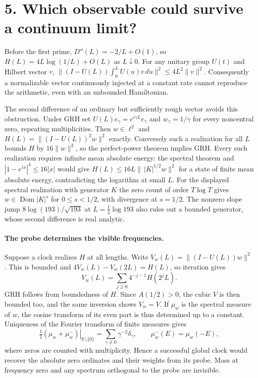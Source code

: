\documentclass[11pt]{article}
\begin{document}
\newpage
\section*{5. Which observable could survive a continuum limit?}
Before the first prime, $D''(L)=-2/L+O(1)$, so
$H(L)=4L\log(1/L)+O(L)$ as $L\downarrow0$.
For any unitary group $U(t)$ and Hilbert vector $v$,
$\|(I-U(L))\int_0^L U(u)v\,du\|^2\le4L^2\|v\|^2$.
Consequently a normalizable vector continuously injected at a constant
rate cannot reproduce the arithmetic, even with an unbounded Hamiltonian.

The second difference of an ordinary but sufficiently rough vector avoids
this obstruction. Under GRH set $U(L)e_\gamma=e^{i\gamma L}e_\gamma$ and
$w_\gamma=1/\gamma$ for every noncentral zero, repeating multiplicities.
Then $w\in\ell^2$ and $H(L)=\|(I-U(L))^2w\|^2$ exactly.
Conversely such a realization for all $L$ bounds $H$ by $16\|w\|^2$,
so the perfect-power theorem implies GRH. Every such realization requires
infinite mean absolute energy: the spectral theorem and
$|1-e^{ix}|^4\le16|x|$ would give
$H(L)\le16L\|\,|K|^{1/2}w\|^2$ for a state of finite mean absolute energy,
contradicting the logarithm at small $L$. For the displayed spectral
realization with generator $K$ the zero count of order $T\log T$ gives
$w\in\operatorname{Dom}|K|^s$ for $0\le s<1/2$, with divergence at $s=1/2$.
The nonzero slope jump $8\log(193)/\sqrt{193}$ at $L=\frac12\log193$
also rules out a bounded generator, whose second difference is real analytic.

\paragraph{The probe determines the visible frequencies.}
Suppose a clock realizes $H$ at all lengths. Write
$V_w(L)=\|(I-U(L))w\|^2$. This is bounded and $4V_w(L)-V_w(2L)=H(L)$,
so iteration gives
\[
 V_w(L)=\sum_{j\ge0}4^{-j-1}H(2^jL).
\]
GRH follows from boundedness of $H$. Since $A(1/2)>0$, the cubic $V$ is
then bounded too, and the same inversion shows $V_w=V$. If $\mu_w$ is the
spectral measure of $w$, the cosine transform of its even part is thus
determined up to a constant. Uniqueness of the Fourier transform of finite
measures gives
\[
 \left.\tfrac12(\mu_w+\mu_w^{-})\right|_{\mathbb R\setminus\{0\}}
   =\sum_{\gamma\ne0}\gamma^{-2}\delta_\gamma,
 \qquad \mu_w^{-}(E)=\mu_w(-E),
\]
where zeros are counted with multiplicity. Hence a successful global clock
would recover the absolute zero ordinates and their weights from its probe.
Mass at frequency zero and any spectrum orthogonal to the probe are invisible.
\end{document}
